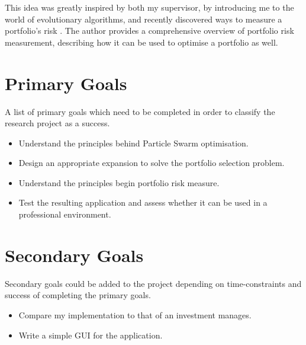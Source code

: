   This idea was greatly inspired by both my supervisor, by introducing me to the world of evolutionary algorithms, and recently discovered ways to measure a portfolio's risk \cite{two_sided_risk}. The author provides a comprehensive overview of portfolio risk measurement, describing how it can be used to optimise a portfolio as well.

  \section{Primary Goals} %
  \label{sec:primary_goals}
  A list of primary goals which need to be completed in order to classify the research project as a success.
  \begin{itemize}
    \item Understand the principles behind Particle Swarm optimisation.
    \item Design an appropriate expansion to solve the portfolio selection problem.
    \item Understand the principles begin portfolio risk measure.
    \item Test the resulting application and assess whether it can be used in a professional environment.
  \end{itemize}

  \section{Secondary Goals} %
  \label{sec:secondary_goals}
  Secondary goals could be added to the project depending on time-constraints and success of completing the primary goals.
  \begin{itemize}
    \item Compare my implementation to that of an investment manages. 
    \item Write a simple GUI for the application.
  \end{itemize}
